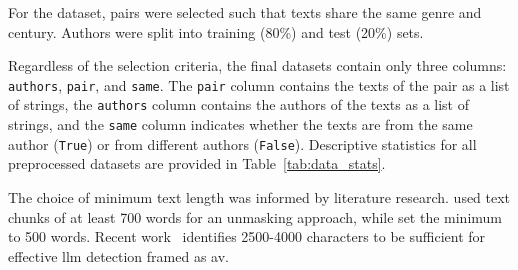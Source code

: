 

For the \dataGutenberg{} dataset, pairs were selected such that texts share the same genre and century. 
Authors were split into training (80\%) and test (20\%) sets.

Regardless of the selection criteria, the final datasets contain only three columns: \texttt{authors}, \texttt{pair}, and \texttt{same}.
The \texttt{pair} column contains the texts of the pair as a list of strings,
the \texttt{authors} column contains the authors of the texts as a list of strings,
and the \texttt{same} column indicates whether the texts are from the same author (\texttt{True}) or from different authors (\texttt{False}).
Descriptive statistics for all preprocessed datasets are provided in Table~\ref{tab:data_stats}.

The choice of minimum text length was informed by literature research.
\citet{bevendorff_generalizing_2019} used text chunks of at least 700 words for an unmasking approach, while \citet{koppel_authorship_2004} set the minimum to 500 words.
Recent work~\citep{llm_detection_av_2025} identifies \num{2500}-\num{4000} characters to be sufficient for effective \ac{llm} detection framed as \ac{av}.

